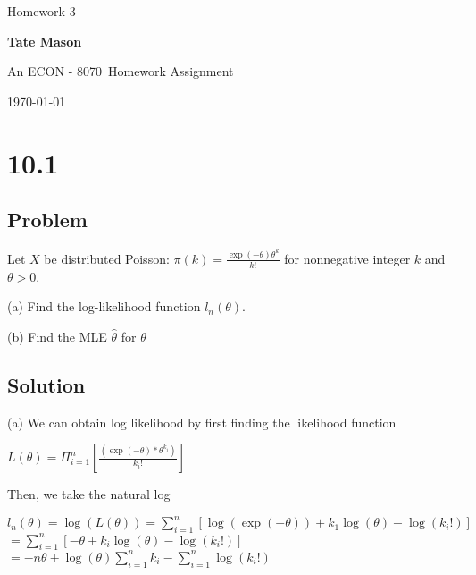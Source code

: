 \documentclass[10pt, a4paper]{article}
\newcommand\course{ECON - 8070}                            %
\newcommand\hwnumber{ 3}                                 %
\newcommand\Information{Tate Mason}                        %
\begin{document}
  \begin{titlepage}
    \begin{center}
      \vspace*{3cm}
            
        \vspace{1cm}
        \huge
        Homework \hwnumber
            
        \vspace{1.5cm}
        \Large
            
        \textbf{\Information}                      %
            
        \vfill
        
        An \course \ Homework Assignment
            
        \vspace{1cm}
        \Large
        
        \today
            
    \end{center}
  \end{titlepage}

  \newpage
  \section*{10.1}
    \subsection*{Problem}
      Let $X$ be distributed Poisson: $\pi(k)=\frac{\exp(-\theta)\theta^k}{k!}$ for nonnegative integer $k$ and $\theta>0$.

      (a) Find the log-likelihood function $l_n(\theta)$.

      (b) Find the MLE $\hat \theta$ for $\theta$ 
    \subsection*{Solution}
      (a) We can obtain log likelihood by first finding the likelihood function 
      \begin{center}
        $L(\theta)=\Pi^n_{i=1}[\frac{(\exp(-\theta)*\theta^{k_i})}{k_i!}]$
      \end{center}
      Then, we take the natural log
      \begin{center}
        $l_n(\theta)=\log(L(\theta))=\sum_{i=1}^n[\log(\exp(-\theta))+k_1\log(\theta)-\log(k_i!)]$ \\
        $ = \sum_{i=1}^n[-\theta+k_i\log(\theta)-\log(k_i!)]$ \\
        $\boxed{= -n\theta +\log(\theta)\sum_{i=1}^nk_i-\sum_{i=1}^n\log(k_i!)}$  
      \end{center}
\end{document}
